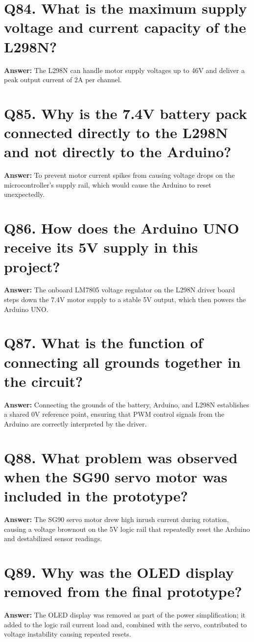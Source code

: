 \documentclass[12pt,a4paper,oneside]{report}
\begin{document}
\section{Q84. What is the maximum supply voltage and current capacity of the L298N?}
\textbf{Answer:} The L298N can handle motor supply voltages up to 46V and deliver a peak output current of 2A per channel.

\section{Q85. Why is the 7.4V battery pack connected directly to the L298N and not directly to the Arduino?}
\textbf{Answer:} To prevent motor current spikes from causing voltage drops on the microcontroller's supply rail, which would cause the Arduino to reset unexpectedly.

\section{Q86. How does the Arduino UNO receive its 5V supply in this project?}
\textbf{Answer:} The onboard LM7805 voltage regulator on the L298N driver board steps down the 7.4V motor supply to a stable 5V output, which then powers the Arduino UNO.

\section{Q87. What is the function of connecting all grounds together in the circuit?}
\textbf{Answer:} Connecting the grounds of the battery, Arduino, and L298N establishes a shared 0V reference point, ensuring that PWM control signals from the Arduino are correctly interpreted by the driver.

\section{Q88. What problem was observed when the SG90 servo motor was included in the prototype?}
\textbf{Answer:} The SG90 servo motor drew high inrush current during rotation, causing a voltage brownout on the 5V logic rail that repeatedly reset the Arduino and destabilized sensor readings.

\section{Q89. Why was the OLED display removed from the final prototype?}
\textbf{Answer:} The OLED display was removed as part of the power simplification; it added to the logic rail current load and, combined with the servo, contributed to voltage instability causing repeated resets.
\end{document}
